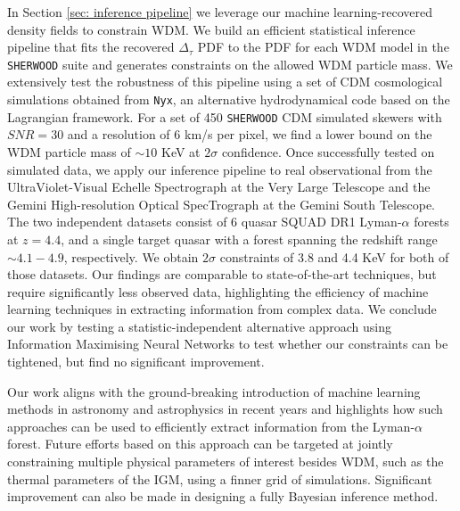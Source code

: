 In Section \ref{sec: inference pipeline} we leverage our machine learning-recovered density fields to constrain WDM. We build an efficient statistical inference pipeline that fits the recovered $\Delta_\tau$ PDF to the PDF for each WDM model in the \texttt{SHERWOOD} suite and generates constraints on the allowed WDM particle mass. We extensively test the robustness of this pipeline using a set of CDM cosmological simulations obtained from \texttt{Nyx}, an alternative hydrodynamical code based on the Lagrangian framework. For a set of 450 \texttt{SHERWOOD} CDM simulated skewers with $SNR=30$ and a resolution of $6$ km/s per pixel, we find a lower bound on the WDM particle mass of $\sim 10$ KeV at $2\sigma$ confidence. Once successfully tested on simulated data, we apply our inference pipeline to real observational from the UltraViolet-Visual Echelle Spectrograph at the Very Large Telescope and the Gemini High-resolution Optical SpecTrograph at the Gemini South Telescope. The two independent datasets consist of 6 quasar SQUAD DR1 Lyman-$\alpha$ forests at $z=4.4$, and a single target quasar with a forest spanning the redshift range $\sim 4.1-4.9$, respectively. We obtain $2\sigma$ constraints of 3.8 and 4.4 KeV for both of those datasets. Our findings are comparable to state-of-the-art techniques, but require significantly less observed data, highlighting the efficiency of machine learning techniques in extracting information from complex data. We conclude our work by testing a statistic-independent alternative approach using Information Maximising Neural Networks to test whether our constraints can be tightened, but find no significant improvement.

Our work aligns with the ground-breaking introduction of machine learning methods in astronomy and astrophysics in recent years and highlights how such approaches can be used to efficiently extract information from the Lyman-$\alpha$ forest. Future efforts based on this approach can be targeted at jointly constraining multiple physical parameters of interest besides WDM, such as the thermal parameters of the IGM, using a finner grid of simulations. Significant improvement can also be made in designing a fully Bayesian inference method.